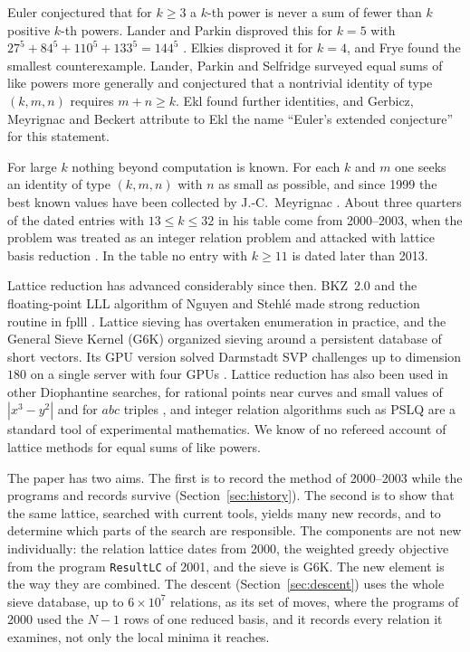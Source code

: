\documentclass[11pt]{amsart}
\theoremstyle{definition}
\theoremstyle{remark}
\begin{document}
Euler conjectured that for $k\ge3$ a $k$-th power is never a sum of fewer than $k$ positive
$k$-th powers. Lander and Parkin disproved this for $k=5$ with
$27^5+84^5+110^5+133^5=144^5$ \cite{LanderParkin1966,LanderParkin1967}. Elkies
\cite{Elkies1988} disproved it for $k=4$, and Frye \cite{Frye1988} found the smallest
counterexample. Lander, Parkin and
Selfridge \cite{LanderParkinSelfridge1967} surveyed equal sums of like powers more generally
and conjectured that a nontrivial identity of type $(k,m,n)$ requires $m+n\ge k$. Ekl
\cite{Ekl1996,Ekl1998} found further identities, and Gerbicz, Meyrignac and Beckert
\cite{GerbiczMeyrignacBeckert2011} attribute to Ekl \cite{Ekl1998} the name ``Euler's
extended conjecture'' for this statement.

For large $k$ nothing beyond computation is known. For each $k$ and $m$ one seeks an identity
of type $(k,m,n)$ with $n$ as small as possible, and since 1999 the best known values have been
collected by J.-C.~Meyrignac \cite{MeyrignacEuler}. About three quarters of the dated entries
with $13\le k\le32$ in his table come from 2000--2003, when the problem was treated as an
integer relation problem and attacked with lattice basis reduction
\cite{LLL1982,SchnorrEuchner1994,ChildersSumsPage2000,CrumpEqualSums2001}. In the table no
entry with $k\ge11$ is dated later than 2013.

Lattice reduction has advanced considerably since then. BKZ~2.0
\cite{ChenNguyen2011} and the floating-point LLL algorithm of Nguyen and Stehl\'e
\cite{NguyenStehle2009} made strong reduction routine in fplll \cite{fplll}. Lattice sieving
\cite{NguyenVidick2008,MicciancioVoulgaris2010,BeckerDucasGamaLaarhoven2016} has overtaken
enumeration in practice, and the General Sieve Kernel (G6K) \cite{AlbrechtEtAl2019}
organized sieving around a persistent database of short vectors. Its GPU version solved
Darmstadt SVP challenges up to dimension $180$ on a single server with four GPUs
\cite{DucasStevensVanWoerden2021}. Lattice reduction has also been used in other Diophantine
searches, for rational points near curves and small values of $|x^3-y^2|$
\cite{Elkies2000} and for $abc$ triples \cite{Dokchitser2004}, and integer relation
algorithms such as PSLQ \cite{FergusonBaileyArno1999,BaileyBroadhurst2001} are a standard tool
of experimental mathematics. We know of no refereed account of lattice methods for equal sums
of like powers.

The paper has two aims. The first is to record the method of 2000--2003 while the programs
and records survive (Section~\ref{sec:history}). The second is to show that the same lattice,
searched with current tools, yields many new records, and to determine which parts of the
search are responsible. The components are not new individually: the relation lattice
dates from 2000, the weighted greedy objective from the program \texttt{ResultLC} of 2001, and the
sieve is G6K. The new element is the way they are combined. The descent
(Section~\ref{sec:descent}) uses the whole sieve database, up to $6\times10^7$
relations, as its set of moves, where the programs of 2000 used the $N-1$ rows of one
reduced basis, and it records every relation it examines, not only the local minima it
reaches.
\end{document}
